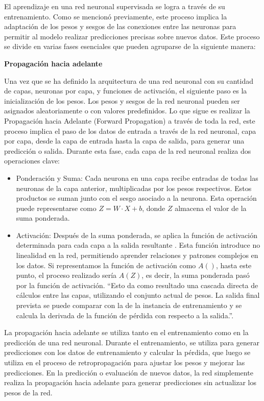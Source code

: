 El aprendizaje en una red neuronal supervisada se logra a través de su entrenamiento. Como se mencionó previamente, este proceso implica la adaptación de los pesos y sesgos de las conexiones entre las neuronas para permitir al modelo realizar predicciones precisas sobre nuevos datos. Este proceso se divide en varias fases esenciales que pueden agruparse de la siguiente manera:

\textbf{Propagación hacia adelante}

Una vez que se ha definido la arquitectura de una red neuronal con su cantidad de capas, neuronas por capa, y funciones de activación, el siguiente paso es la inicialización de los pesos. Los pesos y sesgos de la red neuronal pueden ser asignados aleatoriamente o con valores predefinidos.
Lo que sigue es realizar la Propagación hacia Adelante (Forward Propagation) a través de toda la red, este proceso implica el paso de los datos de entrada a través de la red neuronal, capa por capa, desde la capa de entrada hasta la capa de salida, para generar una predicción o salida. Durante esta fase, cada capa de la red neuronal realiza dos operaciones clave:

\begin{itemize}
	\item Ponderación y Suma: Cada neurona en una capa recibe entradas de todas las neuronas de la capa anterior, multiplicadas por los pesos respectivos. Estos productos se suman junto con el sesgo asociado a la neurona. Esta operación puede representarse como $Z=W\cdot X+b$, donde $Z$ almacena el valor de la suma ponderada.
	\item Activación: Después de la suma ponderada, se aplica la función de activación determinada para cada capa a la salida resultante . Esta función introduce no linealidad en la red, permitiendo aprender relaciones y patrones complejos en los datos. Si representamos la función de activación como $A()$, hasta este punto, el proceso realizado sería $A(Z)$, es decir, la suma ponderada pasó por la función de activación. ``Esto da como resultado una cascada directa de cálculos entre las capas, utilizando el conjunto actual de pesos. La salida final prevista se puede comparar con la de la instancia de entrenamiento y se calcula la derivada de la función de pérdida con respecto a la salida.''\cite[p.22]{aggarwal2018neural}.
\end{itemize}

La propagación hacia adelante se utiliza tanto en el entrenamiento como en la predicción de una red neuronal. Durante el entrenamiento, se utiliza para generar predicciones con los datos de entrenamiento y calcular la pérdida, que luego se utiliza en el proceso de retropropagación para ajustar los pesos y mejorar las predicciones. En la predicción o evaluación de nuevos datos, la red simplemente realiza la propagación hacia adelante para generar predicciones sin actualizar los pesos de la red.



